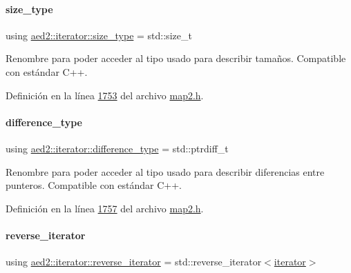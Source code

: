 \paragraph{\texorpdfstring{size\+\_\+type}{size\_type}}
{\footnotesize\ttfamily using \hyperlink{classaed2_1_1iterator_a0d460d3f76439cea3436e1113990be47_a0d460d3f76439cea3436e1113990be47}{aed2\+::iterator\+::size\+\_\+type} =  std\+::size\+\_\+t}



Renombre para poder acceder al tipo usado para describir tamaños. Compatible con estándar C++. 



Definición en la línea \hyperlink{map2_8h_source_l01753}{1753} del archivo \hyperlink{map2_8h_source}{map2.\+h}.

\mbox{\label{classaed2_1_1iterator_a552af1cab9391f5af6bb86d457031329_a552af1cab9391f5af6bb86d457031329}} 
\paragraph{\texorpdfstring{difference\+\_\+type}{difference\_type}}
{\footnotesize\ttfamily using \hyperlink{classaed2_1_1iterator_a552af1cab9391f5af6bb86d457031329_a552af1cab9391f5af6bb86d457031329}{aed2\+::iterator\+::difference\+\_\+type} =  std\+::ptrdiff\+\_\+t}



Renombre para poder acceder al tipo usado para describir diferencias entre punteros. Compatible con estándar C++. 



Definición en la línea \hyperlink{map2_8h_source_l01757}{1757} del archivo \hyperlink{map2_8h_source}{map2.\+h}.

\mbox{\label{classaed2_1_1iterator_a07b2c0fa31611e03cd019b290acd6d80_a07b2c0fa31611e03cd019b290acd6d80}} 
\paragraph{\texorpdfstring{reverse\+\_\+iterator}{reverse\_iterator}}
{\footnotesize\ttfamily using \hyperlink{classaed2_1_1iterator_a07b2c0fa31611e03cd019b290acd6d80_a07b2c0fa31611e03cd019b290acd6d80}{aed2\+::iterator\+::reverse\+\_\+iterator} =  std\+::reverse\+\_\+iterator$<$\hyperlink{classaed2_1_1iterator_1_1iterator}{iterator}$>$}



